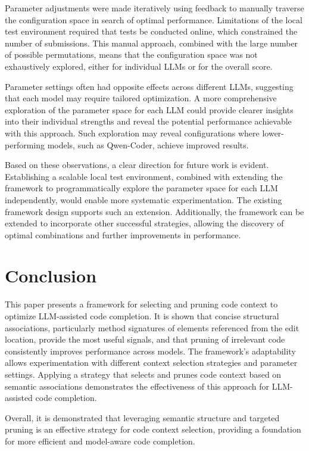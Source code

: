 \documentclass[conference]{IEEEtran}
\begin{document}
Parameter adjustments were made iteratively using feedback to manually traverse the configuration space in search of optimal performance.  
Limitations of the local test environment required that tests be conducted online, which constrained the number of submissions.  
This manual approach, combined with the large number of possible permutations, 
means that the configuration space was not exhaustively explored, either for individual LLMs or for the overall score.

Parameter settings often had opposite effects across different LLMs, suggesting that 
each model may require tailored optimization. A more comprehensive exploration of the parameter space for 
each LLM could provide clearer insights into their individual strengths and reveal the potential performance 
achievable with this approach. Such exploration may reveal configurations where lower-performing models, 
such as Qwen-Coder, achieve improved results.

Based on these observations, a clear direction for future work is evident. Establishing a scalable local test environment, 
combined with extending the framework to programmatically explore the parameter space for each LLM independently,
 would enable more systematic experimentation. The existing framework design supports such an extension. 
 Additionally, the framework can be extended to incorporate other successful strategies, allowing the discovery 
 of optimal combinations and further improvements in performance.
\section{Conclusion}

This paper presents a framework for selecting and pruning code context to optimize LLM-assisted code completion.
It is shown that concise structural associations, particularly method signatures of elements referenced from the edit location, provide the most useful signals, and that pruning of irrelevant code consistently improves performance across models.
The framework’s adaptability allows experimentation with different context selection strategies and parameter settings.
Applying a strategy that selects and prunes code context based on semantic associations demonstrates the effectiveness 
of this approach for LLM-assisted code completion.

Overall, it is demonstrated that leveraging semantic structure and targeted pruning is an effective strategy for 
code context selection, providing a foundation for more efficient and model-aware code completion.
\end{document}
